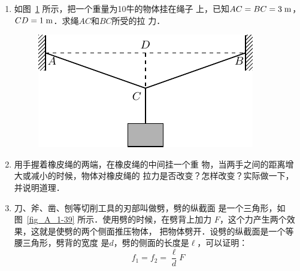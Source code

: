 \begin{enumerate}
\item 如图~\ref{fig_A_1-38} 所示，把一个重量为10牛的物体挂在绳子
上，已知$AC=BC=3 \;\text{m} $，$CD=1 \;\text{m} $．求绳$AC$和$BC$所受的拉
力．
\begin{figure}[htbp]
    \centering
    \includegraphics{fig/A/1-38.pdf}
    \caption{} \label{fig_A_1-38} 
\end{figure} 


\item   用手握着橡皮绳的两端，在橡皮绳的中间挂一个重
物，当两手之间的距离增大或减小的时候，物体对橡皮绳的
拉力是否改变？怎样改变？实际做一下，并说明道理．

\item  刀、斧、凿、刨等切削工具的刃部叫做劈，劈的纵截面
是一个三角形，如图~\ref{fig_A_1-39} 所示．使用劈的时候，在劈背上加力
$F$，这个力产生两个效果，这就是使劈的两个侧面推压物体，
把物体劈开．设劈的纵截面是一个等腰三角形，劈背的宽度
是$d$，劈的侧面的长度是$\ell$，可以证明：
\[f_1=f_2=\frac{\ell} {d} F \]


\end{enumerate}
